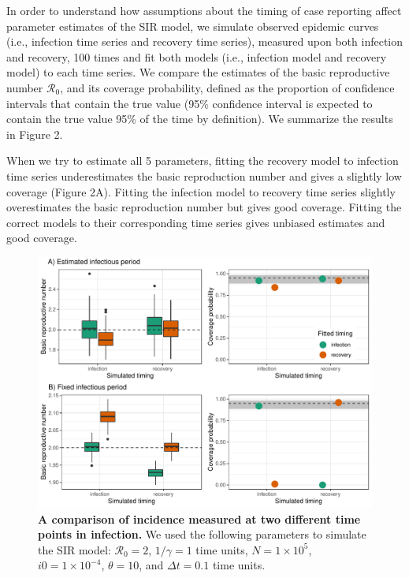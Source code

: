 \documentclass{article}\usepackage[]{graphicx}\usepackage[]{color}
\begin{document}
In order to understand how assumptions about the timing of case reporting affect 
parameter estimates of the SIR model, we simulate observed epidemic curves 
(i.e., infection time series and recovery time series), measured upon both infection and
recovery, 100 times and fit both models (i.e., infection model and recovery model) to each 
time series. We compare the estimates of the basic reproductive number $\mathcal R_0$,
and its coverage probability, defined as the proportion of confidence intervals that
contain the true value (95\% confidence interval is expected to contain the true value
95\% of the time by definition). We summarize the results in Figure 2.

When we try to estimate all 5 parameters, fitting the recovery model to
infection time series underestimates the basic reproduction number and 
gives a slightly low coverage (Figure 2A). Fitting the infection model to recovery
time series slightly overestimates the basic reproduction number but gives 
good coverage. Fitting the correct models to their corresponding time series
gives unbiased estimates and good coverage.

\begin{figure}
\includegraphics[width=\textwidth]{../figure/compare_deterministic.pdf}
\caption{
\textbf{A comparison of incidence measured at two different time points in infection.}
We used the following parameters to simulate the SIR model: 
$\mathcal R_0 = 2$, $1/\gamma = 1$ time units, $N = 1 \times 10^5$, $i0 = 1 \times 10^{-4}$,
$\theta = 10$, and $\Delta t = 0.1$ time units.
}
\end{figure}
\end{document}
